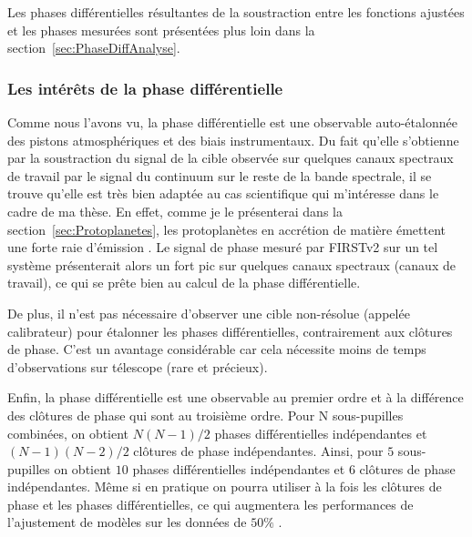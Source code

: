 Les phases différentielles résultantes de la soustraction entre les fonctions ajustées et les phases mesurées sont présentées plus loin dans la section~\ref{sec:PhaseDiffAnalyse}.


\subsubsection{Les intérêts de la phase différentielle}

Comme nous l'avons vu, la phase différentielle est une observable auto-étalonnée des pistons atmosphériques et des biais instrumentaux. Du fait qu'elle s'obtienne par la soustraction du signal de la cible observée sur quelques canaux spectraux de travail par le signal du continuum sur le reste de la bande spectrale, il se trouve qu'elle est très bien adaptée au cas scientifique qui m'intéresse dans le cadre de ma thèse. En effet, comme je le présenterai dans la section~\ref{sec:Protoplanetes}, les protoplanètes en accrétion de matière émettent une forte raie d'émission \ha. Le signal de phase mesuré par \ac{FIRSTv2} sur un tel système présenterait alors un fort pic sur quelques canaux spectraux (canaux de travail), ce qui se prête bien au calcul de la phase différentielle.

De plus, il n'est pas nécessaire d'observer une cible non-résolue (appelée calibrateur) pour étalonner les phases différentielles, contrairement aux clôtures de phase. C'est un avantage considérable car cela nécessite moins de temps d'observations sur télescope (rare et précieux).

Enfin, la phase différentielle est une observable au premier ordre et à la différence des clôtures de phase qui sont au troisième ordre. Pour N sous-pupilles combinées, on obtient $N(N-1)/2$ phases différentielles indépendantes et $(N-1)(N-2)/2$ clôtures de phase indépendantes. Ainsi, pour $5$ sous-pupilles on obtient $10$ phases différentielles indépendantes et $6$ clôtures de phase indépendantes. Même si en pratique on pourra utiliser à la fois les clôtures de phase et les phases différentielles, ce qui augmentera les performances de l'ajustement de modèles sur les données de $50 \%$ \citep{millour2006}.

